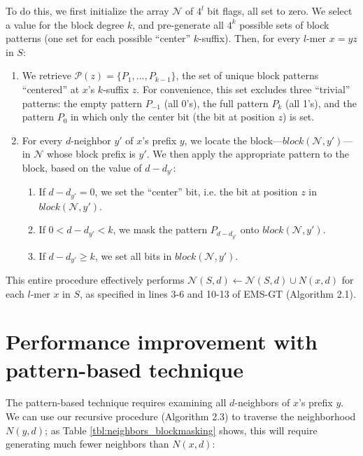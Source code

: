 \documentclass[oneside,12pt]{DISCSthesis}
\begin{document}
{		To do this, we first initialize the array $\mathcal{N}$ of $4^l$ bit flags, all set to zero. We select a value for the block degree $k$, and pre-generate all $4^k$ possible sets of block patterns (one set for each possible ``center'' $k$-suffix). Then, for every $l$-mer $x = yz$ in $S$:
		\begin{enumerate}
			\item We retrieve $\mathcal{P}(z) = \{P_{1}, ... , P_{k-1}\}$, the set of unique block patterns ``centered'' at $x$'s $k$-suffix $z$. For convenience, this set excludes three ``trivial'' patterns: the empty pattern $P_{-1}$ (all 0's), the full pattern $P_{k}$ (all 1's), and the pattern $P_{0}$ in which only the center bit (the bit at position $z$) is set.
			\item For every $d$-neighbor $y'$ of $x$'s prefix $y$, we locate the block---$block(\mathcal{N}, y')$---in $\mathcal{N}$ whose block prefix is $y'$. We then apply the appropriate pattern to the block, based on the value of $d - d_{y'}$:
			\begin{enumerate}
				\item If $d - d_{y'} = 0$, we set the ``center'' bit, i.e. the bit at position $z$ in $block(\mathcal{N}, y')$.
				\item If $0 < d - d_{y'} < k$, we mask the pattern $P_{d - d_{y'}}$ onto $block(\mathcal{N}, y')$.
				\item If $d - d_{y'} \geq k$, we set all bits in $block(\mathcal{N}, y')$.
			\end{enumerate}
		\end{enumerate}

		\noindent This entire procedure effectively performs $\mathcal{N}(S,d) \leftarrow \mathcal{N}(S,d) \cup N(x,d)$ for each $l$-mer $x$ in $S$, as specified in lines 3-6 and 10-13 of EMS-GT (Algorithm 2.1).

	\section{Performance improvement with pattern-based technique}
		The pattern-based technique requires examining all $d$-neighbors of $x$'s prefix $y$.%
		We can use our recursive procedure (Algorithm 2.3) to traverse the neighborhood $N(y,d)$; as Table \ref{tbl:neighbors_blockmasking} shows, this will require generating much fewer neighbors than $N(x,d)$:\newline

}
\end{document}
